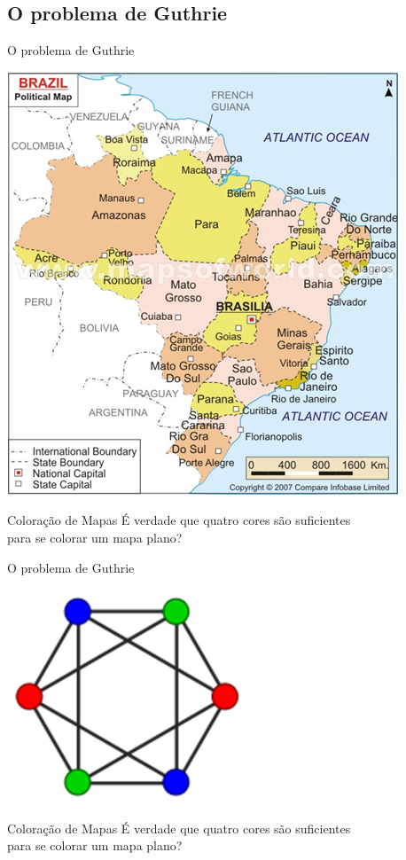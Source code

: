 \documentclass[xcolor=dvipsnames,table]{beamer}
\begin{document}
	\subsection{O problema de Guthrie}
	\begin{frame}[shrink]{O problema de Guthrie}
		\begin{center}
    		\includegraphics[height=.6\textheight]{images/mapa.png}
  		\end{center} \pause
		\begin{alertblock}{Coloração de Mapas} \pause
			É verdade que quatro cores são suficientes \\
			para se colorar um mapa plano?
		\end{alertblock}
	\end{frame}
	
	\begin{frame}[shrink]{O problema de Guthrie}
		\begin{center}
    		\includegraphics[height=.6\textheight]{images/grafoColorido.png}
  		\end{center}
		\begin{alertblock}{Coloração de Mapas}
			É verdade que quatro cores são suficientes \\
			para se colorar um mapa plano?
		\end{alertblock}
	\end{frame}
	
\end{document}

